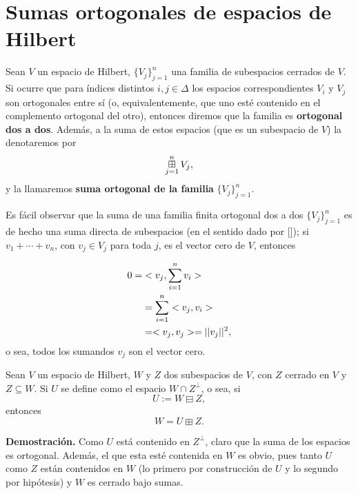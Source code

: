 \section{Sumas ortogonales de espacios de Hilbert}



\begin{defi} \label{def: suma ortogonal finita de subespacios ortogonales dos a dos}
Sean $V$ un espacio de Hilbert, 
$\{ V_{j} \}_{j=1}^{n}$ una familia de subespacios cerrados
de $V$. Si ocurre que para índices distintos 
$i,j \in \Delta$ los espacios correspondientes
$V_{i}$ y $V_{j}$ son ortogonales entre sí (o, equivalentemente,
que uno esté contenido en el complemento ortogonal
del otro), entonces
diremos que la familia es 
\textbf{ortogonal dos a dos}. Además, a la suma
de estos espacios (que es un subespacio de $V$)
la denotaremos por
\[
\operatorname*{{\boxplus}}_{j =1 }^{n} V_{j},
\]
y la llamaremos \textbf{suma ortogonal de la familia}
$\{ V_{j} \}_{j=1}^{n}$.
\end{defi}

Es fácil observar que la suma de una familia finita
ortogonal dos a dos $\{ V_{j} \}_{j=1}^{n}$
es de hecho una suma directa
de subespacios (en el sentido dado por []);
si $v_{1} + \cdots +v_{n}$, con $v_{j} \in V_{j}$
para toda $j$, es el vector cero de $V$, entonces

\begin{align*}
0 =  & < v_{j} , \sum\limits_{i=1}^{n}v_{i} > \\
& = \sum\limits_{i=1}^{n}<v_{j} , v_{i}> \\
& =< v_{j} , v_{j} > = || v_{j} ||^{2},
\end{align*}
o sea, todos los sumandos $v_{j}$
son el vector cero. \\

\begin{prop} \label{prop: pasar de resta ortogonal a suma ortogonal}
Sean $V$ un espacio de Hilbert, $W$ y $Z$ dos subespacios
de $V$, con $Z$ cerrado en $V$ y $Z \subseteq W$.
Si $U$ se define como el espacio $W \cap Z^{\perp}$, 
o sea, si 
\[
U:= W \boxminus Z,
\]
entonces 
\[
W= U \boxplus Z.
\]
\end{prop}
\noindent
\textbf{Demostración.}
Como $U$ está contenido en $Z^{\perp}$, 
claro que la suma de los espacios es ortogonal.
Además, el que esta esté contenida en $W$ es obvio,
pues tanto $U$ como $Z$ están contenidos en $W$
(lo primero por construcción de $U$ y lo 
segundo por hipótesis) y $W$ es 
cerrado bajo sumas.

